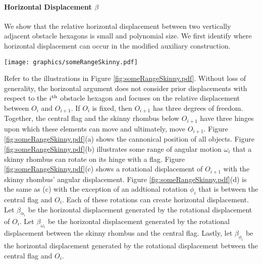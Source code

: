 \paragraph{Horizontal Displacement $\beta$}

We show that the relative horizontal displacement between two vertically adjacent obstacle hexagons is small and polynomial size.
We first identify where horizontal displacement can occur in the modified auxiliary construction.  

\begin{minipage}{\linewidth}
\begin{center}
\texttt{[image: graphics/someRangeSkinny.pdf]}
\label{fig:someRangeSkinny.pdf}
\end{center}
\end{minipage}

Refer to the illustrations in Figure \ref{fig:someRangeSkinny.pdf}.  
Without loss of generality, the horizontal argument does not consider prior displacements with respect to the $i^\text{th}$ obstacle hexagon and focuses on the relative displacement between $O_{i}$ and $O_{i+1}$.  
If $O_i$ is fixed, then $O_{i+1}$ has three degrees of freedom.  
Together, the central flag and the skinny rhombus below $O_{i+1}$ have three hinges upon which these elements can move and ultimately, move $O_{i+1}$.  
Figure \ref{fig:someRangeSkinny.pdf}(a) shows the cannonical position of all objects.  
Figure \ref{fig:someRangeSkinny.pdf}(b) illustrates some range of angular motion $\omega_i$ that a skinny rhombus can rotate on its hinge with a flag.  
Figure \ref{fig:someRangeSkinny.pdf}(c) shows a rotational displacement of $O_{i+1}$ with the skinny rhombus' angular displacement.
Figure \ref{fig:someRangeSkinny.pdf}(d) is the same as (c) with the exception of an addtional rotation $\phi_i$ that is between the central flag and $O_i$.  
Each of these rotations can create horizontal displacement.  
Let $\beta_{\alpha_i}$ be the horizontal displacement generated by the rotational displacement of $O_i$.  
Let $\beta_{\omega_i}$ be the horizontal displacement generated by the rotational displacement between the skinny rhombus and the central flag.  
Lastly, let $\beta_{\phi_i}$ be the horizontal displacement generated by the rotational displacement between the central flag and $O_i$.
